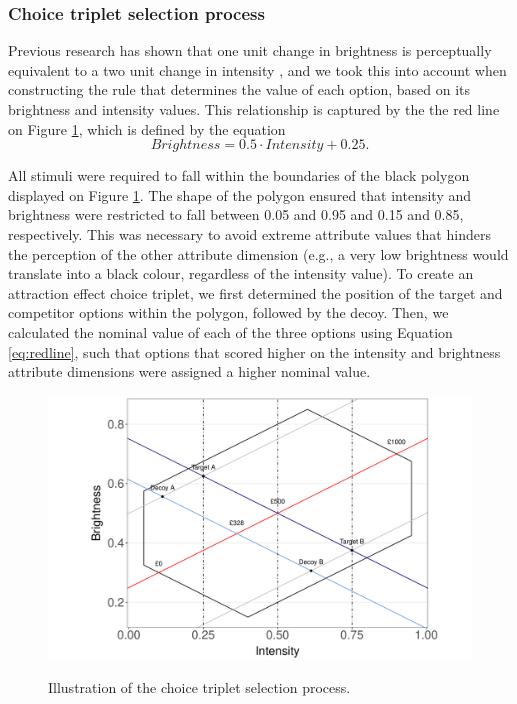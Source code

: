 \documentclass[11pt,a4paper]{article}
\begin{document}
\subsubsection{Choice triplet selection process}

Previous research has shown that one unit change in brightness is perceptually equivalent to a two unit change in intensity \cite{Newhall1940}, and we took this into account when constructing the rule that determines the value of each option, based on its brightness and intensity values. This relationship is captured by the the red line on Figure \ref{fig:explain}, which is defined by the equation
\begin{equation} \label{eq:redline}
 Brightness = 0.5 \cdot Intensity+ 0.25.
\end{equation}


All stimuli were required to fall within the boundaries of the black polygon displayed on Figure \ref{fig:explain}. The shape of the polygon ensured that intensity and brightness were restricted to fall between 0.05 and 0.95 and 0.15 and 0.85, respectively. This was necessary to avoid extreme attribute values that hinders the perception of the other attribute dimension (e.g., a very low brightness would translate into a black colour, regardless of the intensity value). To create an attraction effect choice triplet, we first determined the position of the target and competitor options within the polygon, followed by the decoy. Then, we calculated the nominal value of each of the three options using Equation \ref{eq:redline}, such that options that scored higher on the intensity and brightness attribute dimensions were assigned a higher nominal value.

\begin{figure}
\centering
\caption{Illustration of the choice triplet selection process.}
\includegraphics[width=1\textwidth]{./AE_teapots_Figure_1poly.pdf}
\label{fig:explain}
\end{figure}
\end{document}
